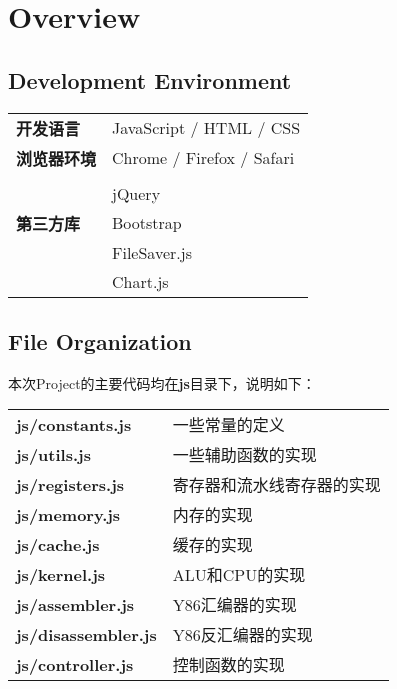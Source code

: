 
\section{Overview}

\subsection{Development Environment}

\begin{table}[h]
\begin{tabular}{ll}
{\bf 开发语言}  & JavaScript / HTML / CSS   \\
{\bf 浏览器环境} & Chrome / Firefox / Safari \\
 & \\
 & jQuery                    \\
{\bf 第三方库} & Bootstrap                 \\
 & FileSaver.js              \\
 & Chart.js                 
\end{tabular}
\end{table}

\subsection{File Organization}

\noindent
本次Project的主要代码均在{\bf js}目录下，说明如下：

\begin{table}[h]
\begin{tabular}{ll}
{\bf js/constants.js}    & 一些常量的定义       \\
{\bf js/utils.js}        & 一些辅助函数的实现     \\
{\bf js/registers.js}    & 寄存器和流水线寄存器的实现 \\
{\bf js/memory.js}       & 内存的实现         \\
{\bf js/cache.js}        & 缓存的实现         \\
{\bf js/kernel.js}       & ALU和CPU的实现    \\
{\bf js/assembler.js}    & Y86汇编器的实现     \\
{\bf js/disassembler.js} & Y86反汇编器的实现    \\
{\bf js/controller.js}   & 控制函数的实现      
\end{tabular}
\end{table}
